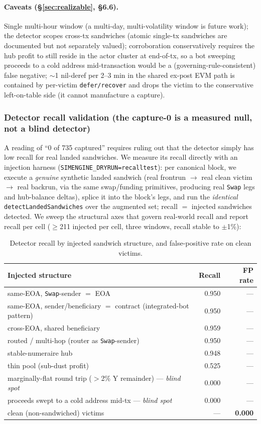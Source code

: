 \documentclass[11pt]{article}
\newcommand{\code}[1]{\texttt{#1}}
\begin{document}
\paragraph{Caveats (\S\ref{sec:realizable}, \S6.6).} Single multi-hour window (a
multi-day, multi-volatility window is future work); the detector scopes cross-tx
sandwiches (atomic single-tx sandwiches are documented but not separately valued);
corroboration conservatively requires the hub profit to still reside in the actor
cluster at end-of-tx, so a bot sweeping proceeds to a cold address mid-transaction
would be a (governing-rule-consistent) false negative; $\sim$1 nil-deref per 2--3 min
in the shared ex-post EVM path is contained by per-victim \code{defer/recover} and
drops the victim to the conservative left-on-table side (it cannot manufacture a
capture).

\subsubsection{Detector recall validation (the capture-0 is a measured null, not a blind detector)}
\label{sec:recall-val}
A reading of ``0 of 735 captured'' requires ruling out that the detector simply has low
recall for real landed sandwiches. We measure its recall directly with an injection
harness (\code{SIMENGINE\_DRYRUN=recalltest}): per canonical block, we execute a
\emph{genuine} synthetic landed sandwich (real frontrun $\to$ real clean victim $\to$
real backrun, via the same swap/funding primitives, producing real \code{Swap} legs and
hub-balance deltas), splice it into the block's legs, and run the \emph{identical}
\code{detectLandedSandwiches} over the augmented set; recall $=$ injected sandwiches
detected. We sweep the structural axes that govern real-world recall and report recall
per cell ($\geq$211 injected per cell, three windows, recall stable to $\pm$1\%):
\begin{table}[h]\centering
\caption{Detector recall by injected sandwich structure, and false-positive rate on
clean victims.}\label{tab:recall}
\begin{tabular}{lrr}
\toprule
Injected structure & Recall & FP rate \\
\midrule
same-EOA, \code{Swap}-sender $=$ EOA & 0.950 & --- \\
same-EOA, sender/beneficiary $=$ contract (integrated-bot pattern) & 0.950 & --- \\
cross-EOA, shared beneficiary & 0.959 & --- \\
routed / multi-hop (router as \code{Swap}-sender) & 0.950 & --- \\
stable-numeraire hub & 0.948 & --- \\
thin pool (sub-dust profit) & 0.525 & --- \\
marginally-flat round trip ($>$2\% Y remainder) --- \emph{blind spot} & 0.000 & --- \\
proceeds swept to a cold address mid-tx --- \emph{blind spot} & 0.000 & --- \\
clean (non-sandwiched) victims & --- & \textbf{0.000} \\
\bottomrule
\end{tabular}
\end{table}
\end{document}
